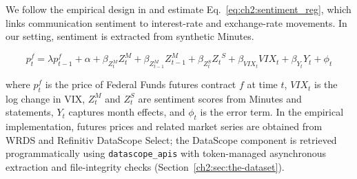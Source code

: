 We follow the empirical design in \citet{tadle2022fomc} and estimate Eq.~\ref{eq:ch2:sentiment_reg}, which links communication sentiment to interest-rate and exchange-rate movements. In our setting, sentiment is extracted from synthetic Minutes.


\begin{equation}\label{eq:ch2:sentiment_reg}
    p^f_t = \lambda p^f_{t-1} + \alpha + \beta_{Z_t^M} Z_t^M+ \beta_{Z_{t-1}^M} Z_{t-1}^M + \beta_{Z_t^S} {Z_t}^S + \beta_{VIX_t}VIX_t + \beta_{Y_t}Y_t + \phi_t 
\end{equation}


where $p_t^f$ is the price of Federal Funds futures contract $f$ at time $t$, $VIX_t$ is the log change in VIX, $Z_t^M$ and $Z_t^S$ are sentiment scores from Minutes and statements, $Y_t$ captures month effects, and $\phi_t$ is the error term. In the empirical implementation, futures prices and related market series are obtained from WRDS and Refinitiv DataScope Select; the DataScope component is retrieved programmatically using \texttt{datascope\_apis} with token-managed asynchronous extraction and file-integrity checks (Section~\ref{ch2:sec:the-dataset}).





